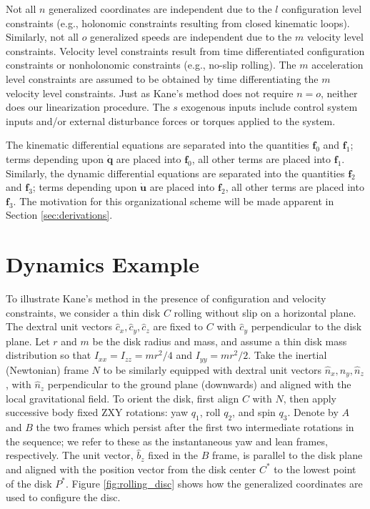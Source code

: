 \documentclass[smallcondensed,final]{svjour3}                     %
\begin{document}
Not all $n$ generalized coordinates are independent due to the $l$
configuration level constraints (e.g., holonomic constraints resulting from
closed kinematic loops). Similarly, not all $o$ generalized speeds are
independent due to the $m$ velocity level constraints.  Velocity level
constraints result from time differentiated configuration constraints or
nonholonomic constraints (e.g., no-slip rolling).  The $m$ acceleration level
constraints are assumed to be obtained by time differentiating the $m$ velocity
level constraints.  Just as Kane's method does not require $n = o$, neither
does our linearization procedure. The $s$ exogenous inputs include control
system inputs and/or external disturbance forces or torques applied to the
system.

The kinematic differential equations are separated into the quantities
$\mathbf{f}_0$ and $\mathbf{f}_1$; terms depending upon $\dot{\mathbf{q}}$ are
placed into $\mathbf{f}_0$, all other terms are placed into $\mathbf{f}_1$.
Similarly, the dynamic differential equations are separated into the
quantities $\mathbf{f}_2$ and $\mathbf{f}_3$; terms depending upon
$\dot{\mathbf{u}}$ are placed into $\mathbf{f}_2$, all other terms are placed
into $\mathbf{f}_3$. The motivation for this organizational scheme will be made
apparent in Section \ref{sec:derivations}.


\section{Dynamics Example}
\label{sec:example}
To illustrate Kane's method in the presence of configuration and velocity
constraints, we consider a thin disk $C$ rolling without slip on a horizontal
plane. The dextral unit vectors $\hat{c}_x, \hat{c}_y, \hat{c}_z$ are fixed to $C$
with $\hat{c}_y$ perpendicular to the disk plane. Let $r$ and $m$ be the
disk radius and mass, and assume a thin disk mass distribution so that
$I_{xx}=I_{zz}=mr^2/4$ and $I_{yy} = mr^2/2$. Take the inertial (Newtonian)
frame $N$ to be similarly equipped with dextral unit vectors $\hat{n}_x,
\hat{n}_y, \hat{n}_z$, with $\hat{n}_z$ perpendicular to the ground plane
(downwards) and aligned with the local gravitational field. To orient the disk,
first align $C$ with $N$, then apply successive body fixed ZXY rotations:
yaw $q_1$, roll $q_2$, and spin $q_3$.  Denote by $A$ and $B$ the two frames
which persist after the first two intermediate rotations in the sequence; we
refer to these as the instantaneous yaw and lean frames, respectively. The unit
vector, $\hat{b}_z$ fixed in the $B$ frame, is parallel to the disk plane and
aligned with the position vector from the disk center $C^*$ to the lowest point
of the disk $P^*$. Figure \ref{fig:rolling_disc} shows how the generalized
coordinates are used to configure the disc.
\end{document}
